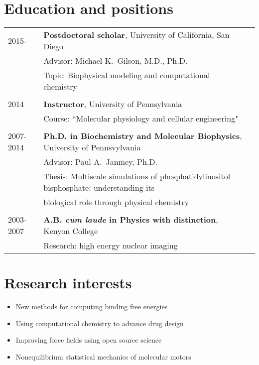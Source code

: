 \documentclass[letterpaper,11pt]{article}
\begin{document}
\maketitle
 
\section{Education and positions}
\begin{tabular}{lll}
2015- & \textbf{Postdoctoral scholar}, University of California, San Diego\\
             & Advisor: Michael K.~Gilson, M.D., Ph.D.\\
             & Topic: Biophysical modeling and computational chemistry \\
             \\
2014         & \textbf{Instructor}, University of Pennsylvania \\
             & Course: ``Molecular physiology and cellular engineering"\\
             \\
2007-2014 & \textbf{Ph.D. in Biochemistry and Molecular Biophysics}, University of Pennsvylvania \\
          & Advisor: Paul A.~Janmey, Ph.D. \\ 
          & Thesis: 
Multiscale simulations of phosphatidylinositol bisphosphate: understanding its \\ & biological role through physical chemistry \\
\\
2003-2007 & \textbf{A.B. \textit{cum laude} in Physics with distinction}, Kenyon College \\
          & Research: high energy nuclear imaging
\end{tabular}

\section{Research interests}
\begin{itemize}
    \item New methods for computing binding free energies
    \item Using computational chemistry to advance drug design  
    \item Improving force fields using open source science
    \item Nonequilibrium statistical mechanics of molecular motors

\end{itemize}
\end{document}
